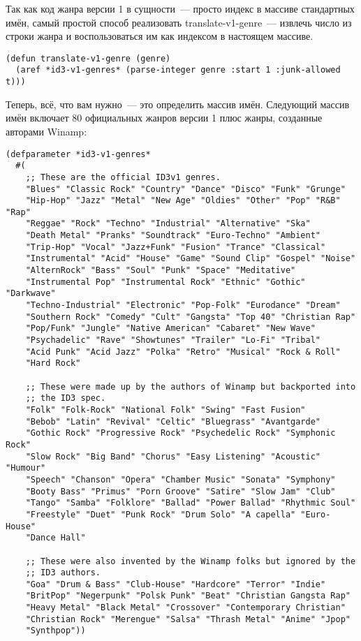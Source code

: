 Так как код жанра версии 1 в сущности~--- просто индекс в массиве стандартных имён, самый
простой способ реализовать translate-v1-genre~--- извлечь число из строки жанра и
воспользоваться им как индексом в настоящем массиве.

\begin{lstlisting}
(defun translate-v1-genre (genre)
  (aref *id3-v1-genres* (parse-integer genre :start 1 :junk-allowed t)))
\end{lstlisting}

Теперь, всё, что вам нужно~--- это определить массив имён. Следующий массив имён включает
80 официальных жанров версии 1 плюс жанры, созданные авторами Winamp:

\begin{lstlisting}
(defparameter *id3-v1-genres*
  #(
    ;; These are the official ID3v1 genres.
    "Blues" "Classic Rock" "Country" "Dance" "Disco" "Funk" "Grunge"
    "Hip-Hop" "Jazz" "Metal" "New Age" "Oldies" "Other" "Pop" "R&B" "Rap"
    "Reggae" "Rock" "Techno" "Industrial" "Alternative" "Ska"
    "Death Metal" "Pranks" "Soundtrack" "Euro-Techno" "Ambient"
    "Trip-Hop" "Vocal" "Jazz+Funk" "Fusion" "Trance" "Classical"
    "Instrumental" "Acid" "House" "Game" "Sound Clip" "Gospel" "Noise"
    "AlternRock" "Bass" "Soul" "Punk" "Space" "Meditative"
    "Instrumental Pop" "Instrumental Rock" "Ethnic" "Gothic" "Darkwave"
    "Techno-Industrial" "Electronic" "Pop-Folk" "Eurodance" "Dream"
    "Southern Rock" "Comedy" "Cult" "Gangsta" "Top 40" "Christian Rap"
    "Pop/Funk" "Jungle" "Native American" "Cabaret" "New Wave"
    "Psychadelic" "Rave" "Showtunes" "Trailer" "Lo-Fi" "Tribal"
    "Acid Punk" "Acid Jazz" "Polka" "Retro" "Musical" "Rock & Roll"
    "Hard Rock"

    ;; These were made up by the authors of Winamp but backported into
    ;; the ID3 spec.
    "Folk" "Folk-Rock" "National Folk" "Swing" "Fast Fusion"
    "Bebob" "Latin" "Revival" "Celtic" "Bluegrass" "Avantgarde"
    "Gothic Rock" "Progressive Rock" "Psychedelic Rock" "Symphonic Rock"
    "Slow Rock" "Big Band" "Chorus" "Easy Listening" "Acoustic" "Humour"
    "Speech" "Chanson" "Opera" "Chamber Music" "Sonata" "Symphony"
    "Booty Bass" "Primus" "Porn Groove" "Satire" "Slow Jam" "Club"
    "Tango" "Samba" "Folklore" "Ballad" "Power Ballad" "Rhythmic Soul"
    "Freestyle" "Duet" "Punk Rock" "Drum Solo" "A capella" "Euro-House"
    "Dance Hall"

    ;; These were also invented by the Winamp folks but ignored by the
    ;; ID3 authors.
    "Goa" "Drum & Bass" "Club-House" "Hardcore" "Terror" "Indie"
    "BritPop" "Negerpunk" "Polsk Punk" "Beat" "Christian Gangsta Rap"
    "Heavy Metal" "Black Metal" "Crossover" "Contemporary Christian"
    "Christian Rock" "Merengue" "Salsa" "Thrash Metal" "Anime" "Jpop"
    "Synthpop"))
\end{lstlisting}


